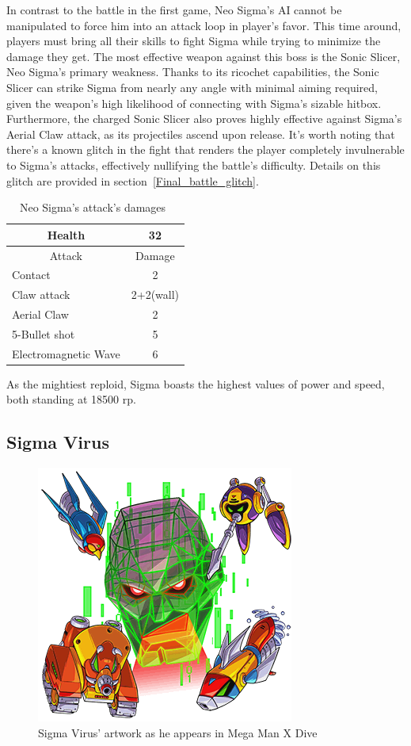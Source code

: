 In contrast to the battle in the first game, Neo Sigma's AI cannot be manipulated to force him into an attack loop in player's favor. This time around, players must bring all their skills to fight Sigma while trying to minimize the damage they get. The most effective weapon against this boss is the Sonic Slicer, Neo Sigma's primary weakness. Thanks to its ricochet capabilities, the Sonic Slicer can strike Sigma from nearly any angle with minimal aiming required, given the weapon's high likelihood of connecting with Sigma's sizable hitbox. Furthermore, the charged Sonic Slicer also proves highly effective against Sigma's Aerial Claw attack, as its projectiles ascend upon release. It's worth noting that there's a known glitch in the fight that renders the player completely invulnerable to Sigma's attacks, effectively nullifying the battle's difficulty. Details on this glitch are provided in section~\ref{Final_battle_glitch}.
\begin{table}[htp]
	\centering
	\begin{tabular}[htp]{l c}
		\toprule
		\multicolumn{1}{c}{Health}  & 32 \\
		\midrule
		\multicolumn{1}{c}{Attack} & \multicolumn{1}{c}{Damage}\\
		Contact & 2 \\
		Claw attack & 2+2(wall)\\
		Aerial Claw& 2\\
		5-Bullet shot& 5\\
		Electromagnetic Wave& 6\\
		\bottomrule
	\end{tabular}
	\caption{Neo Sigma's attack's damages~\cite{wiki:Neo_sigma}}
\end{table}

As the mightiest reploid, Sigma boasts the highest values of power and speed, both standing at 18500 rp.

\subsection{Sigma Virus}\label{boss:Sigma_virus}
\begin{figure}[htp]
	\centering
	\includegraphics[height=\portraitsize]{figures/X2/Hunter_stages/Sigma_Virus.png}
	\caption{Sigma Virus' artwork as he appears in Mega Man X Dive}
\end{figure}

